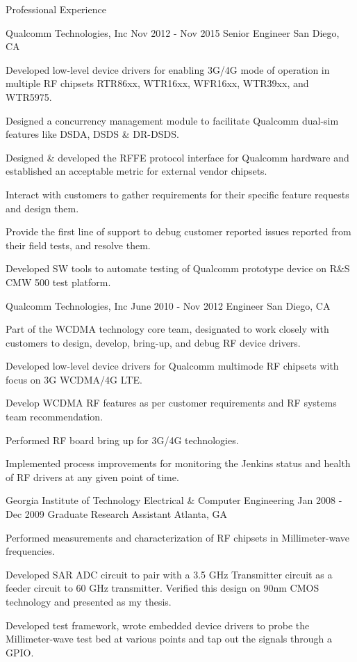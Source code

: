 \documentclass{resume}
\begin{document}
\begin{rSection}{Professional Experience}
    \begin{rSubsection}
    {Qualcomm Technologies, Inc}
    {Nov 2012 - Nov 2015}
    {Senior Engineer}
    {San Diego, CA}
    \item Developed low-level device drivers for enabling 3G/4G mode of 
    operation in multiple RF chipsets RTR86xx, WTR16xx, WFR16xx, WTR39xx, and
    WTR5975.
    \item Designed a concurrency management module to facilitate Qualcomm 
    dual-sim features like DSDA, DSDS \& DR-DSDS.
    \item Designed \& developed the RFFE protocol interface for Qualcomm hardware 
    and established an acceptable metric for external vendor chipsets.
    \item Interact with customers to gather requirements for their specific 
    feature requests and design them. 
    \item Provide the first line of support to debug customer reported issues 
    reported from their field tests, and resolve them.
    \item Developed SW tools to automate testing of Qualcomm prototype device on 
    R\&S CMW 500 test platform.
    \end{rSubsection}    
  
    \begin{rSubsection}
    {Qualcomm Technologies, Inc}
    {June 2010 - Nov 2012}
    {Engineer}
    {San Diego, CA}
    \item Part of the WCDMA technology core team, designated to work closely 
    with customers to design, develop, bring-up, and debug RF device drivers.
    \item Developed low-level device drivers for Qualcomm multimode RF chipsets 
    with focus on 3G WCDMA/4G LTE.
    \item Develop WCDMA RF features as per customer requirements and RF systems 
    team recommendation.
    \item Performed RF board bring up for 3G/4G technologies.    
    \item Implemented process improvements for monitoring the Jenkins status and 
    health of RF drivers at any given point of time.    
    \end{rSubsection}   
      
    \begin{rSubsection}
    {Georgia Institute of Technology \- Electrical \& Computer Engineering}
    {Jan 2008 - Dec 2009}
    {Graduate Research Assistant}
    {Atlanta, GA}
    \item Performed measurements and characterization of RF chipsets in 
    Millimeter-wave frequencies.
    \item Developed SAR ADC circuit to pair with a 3.5 GHz Transmitter circuit 
    as a feeder circuit to 60 GHz transmitter. Verified this design on 90nm CMOS
    technology and presented as my thesis.
    \item Developed test framework, wrote embedded device drivers to probe the 
    Millimeter-wave test bed at various points and tap out the signals through 
    a GPIO. 
    \end{rSubsection}


\end{rSection}
\end{document}
